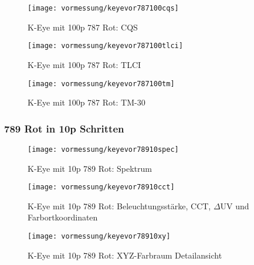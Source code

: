\documentclass[pagesize,paper=A4,fontsize=12pt,utf8,numbers=noenddot,bibliography=totoc,listof=totoc,DIV=11,BCOR=1mm]{scrreprt}
\begin{document}
\begin{figure}[htp]     %
\centering
\texttt{[image: vormessung/keyevor787100cqs]} 
\caption {K-Eye mit 100p 787 Rot: CQS} 
\end{figure}

\begin{figure}[htp]     %
\centering
\texttt{[image: vormessung/keyevor787100tlci]} 
\caption {K-Eye mit 100p 787 Rot: TLCI} 
\end{figure}

\begin{figure}[htp]     %
\centering
\texttt{[image: vormessung/keyevor787100tm]} 
\caption {K-Eye mit 100p 787 Rot: TM-30} 
\end{figure}


\subsubsection{789 Rot in 10p Schritten}

\begin{figure}[htp]     %
\centering
\texttt{[image: vormessung/keyevor78910spec]} 
\caption {K-Eye mit 10p 789 Rot: Spektrum} 
\end{figure}

\begin{figure}[htp]     %
\centering
\texttt{[image: vormessung/keyevor78910cct]} 
\caption {K-Eye mit 10p 789 Rot: Beleuchtungsstärke, CCT, $\Delta$UV und Farbortkoordinaten} 
\end{figure}

\begin{figure}[htp]     %
\centering
\texttt{[image: vormessung/keyevor78910xy]} 
\caption {K-Eye mit 10p 789 Rot: XYZ-Farbraum Detailansicht} 
\end{figure}
\end{document}
